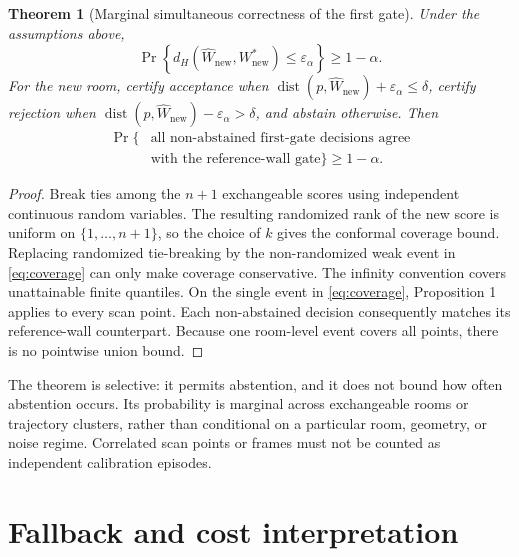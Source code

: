 \documentclass{article}
\newtheorem{theorem}{Theorem}
\DeclareMathOperator{\dist}{dist}
\begin{document}
\begin{theorem}[Marginal simultaneous correctness of the first gate]
Under the assumptions above,
\begin{equation}
 \Pr\!\left\{d_H(\widehat W_{\mathrm{new}},W^*_{\mathrm{new}})
 \leq\varepsilon_\alpha\right\}\geq 1-\alpha.
 \label{eq:coverage}
\end{equation}
For the new room, certify acceptance when
$\dist(p,\widehat W_{\mathrm{new}})+\varepsilon_\alpha\leq\delta$, certify rejection when
$\dist(p,\widehat W_{\mathrm{new}})-\varepsilon_\alpha>\delta$, and abstain otherwise. Then
\begin{equation}
 \begin{aligned}
 \Pr\!\{&\text{all non-abstained first-gate decisions agree}\\
         &\text{with the reference-wall gate}\}\geq 1-\alpha.
 \end{aligned}
 \label{eq:transfer}
\end{equation}
\end{theorem}

\begin{proof}
Break ties among the $n+1$ exchangeable scores using independent continuous random variables. The resulting randomized rank of the new score is uniform on $\{1,\ldots,n+1\}$, so the choice of $k$ gives the conformal coverage bound. Replacing randomized tie-breaking by the non-randomized weak event in \eqref{eq:coverage} can only make coverage conservative. The infinity convention covers unattainable finite quantiles. On the single event in \eqref{eq:coverage}, Proposition 1 applies to every scan point. Each non-abstained decision consequently matches its reference-wall counterpart. Because one room-level event covers all points, there is no pointwise union bound.
\end{proof}

The theorem is selective: it permits abstention, and it does not bound how often abstention occurs. Its probability is marginal across exchangeable rooms or trajectory clusters, rather than conditional on a particular room, geometry, or noise regime. Correlated scan points or frames must not be counted as independent calibration episodes.

\section{Fallback and cost interpretation}
\end{document}
